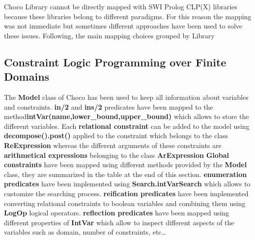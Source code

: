 Choco Library cannot be directly mapped with SWI Prolog CLP(X) libraries
because these libraries belong to different paradigms. For this reason the mapping was not immediate but
sometimes different approaches have been used to solve these issues.\newline\newline
Following, the main mapping choices grouped by Library

\subsection{Constraint Logic Programming over Finite Domains}\label{subsec:map_clpfd}
The \textbf{Model} class of Choco has been used to keep all information about variables and constraints.\newline
\textbf{in/2} and \textbf{ins/2} predicates have been mapped to the method\newline\textbf{intVar(name,lower\_bound,upper\_bound)}
which allows to store the different variables.\newline
Each \textbf{relational constraint} can be added to the model using \textbf{decompose().post()} applied to the constraint which
belongs to the class \textbf{ReExpression} whereas the different arguments of these constraints are \textbf{arithmetical expressions} 
belonging to the class \textbf{ArExpression}
\textbf{Global constraints} have been mapped using different methods provided by the \textbf{Model} class, they
are summarized in the table at the end of this section.
\textbf{enumeration predicates} have been implemented using \textbf{Search.intVarSearch} which allows to customize
the searching process.\newline
\textbf{reification predicates} have been implemented converting relational constraints to boolean variables and
combining them using \textbf{LogOp} logical operators.
\textbf{reflection predicates} have been mapped using different properties of \textbf{IntVar} which
allow to inspect different aspects of the variables such as domain, number of constraints, etc\dots
